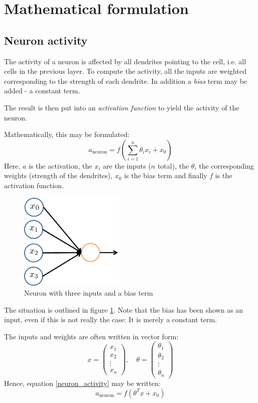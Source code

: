 \documentclass[12pt, a4paper]{article}
\numberwithin{equation}{section}
\begin{document}
\section{Mathematical formulation}

\subsection{Neuron activity}
The activity of a neuron is affected by all dendrites pointing to the cell, i.e. all cells in the previous layer. To compute the activity, all the inputs are weighted corresponding to the strength of each dendrite. In addition a \textit{bias} term may be added - a constant term.

The result is then put into an \textit{activation function} to yield the activity of the neuron.

Mathematically, this may be formulated:
\begin{equation}
\label{neuron_activity}
a_\textrm{neuron}=f\left(\sum_{i=1}^n \theta_i x_i + x_0\right)
\end{equation}
Here, $a$ is the activation, the $x_i$ are the inputs ($n$ total), the $\theta_i$ the corresponding weights (strength of the dendrites), $x_0$ is the bias term and finally $f$ is the activation function.

\begin{figure}
\centering
\includegraphics[width=50mm]{neuron}
\caption{Neuron with three inputs and a bias term}
\label{fig:neuron}
\end{figure}

The situation is outlined in figure \ref{fig:neuron}. Note that the bias has been shown as an input, even if this is not really the case: It is merely a constant term.

The inputs and weights are often written in vector form:
\begin{equation}
x=\begin{pmatrix}
x_1 \\ x_2 \\ \vdots \\ x_n
\end{pmatrix},
\quad
\theta=\begin{pmatrix}
\theta_1 \\ \theta_2 \\ \vdots \\ \theta_n
\end{pmatrix}
\end{equation}
Hence, equation \ref{neuron_activity} may be written:
\begin{equation}
a_\textrm{neuron}=f\left(\theta^T x + x_0\right)
\end{equation}
\end{document}
